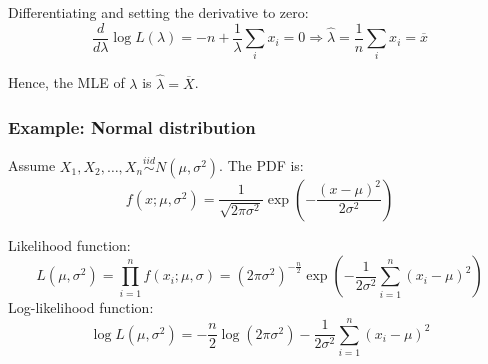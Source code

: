\documentclass[twoside]{book}
\begin{document}
Differentiating and setting the derivative to zero:
\[
\frac{d}{d\lambda}\log L(\lambda) = -n + \frac{1}{\lambda}\sum_i x_i = 0 \Rightarrow \hat{\lambda}  = \frac{1}{n} \sum_i x_i = \overline{x}
\]

Hence, the MLE of $\lambda$ is $\hat{\lambda} = \overline{X}$.

\subsubsection*{Example: Normal distribution}

Assume \( X_1, X_2, \dots, X_n \overset{iid}{\sim} N(\mu, \sigma^2) \). The PDF is:
\[
f(x; \mu, \sigma^2) = \frac{1}{\sqrt{2\pi\sigma^2}} \exp\left( -\frac{(x - \mu)^2}{2\sigma^2} \right)
\]

Likelihood function:
\[
L(\mu, \sigma^2) = \prod_{i=1}^{n}f(x_i; \mu, \sigma) =  (2\pi\sigma^2)^{-\tfrac{n}{2}} \exp \left( - \frac{1}{2\sigma^2} \sum_{i=1}^n (x_i - \mu)^2\right)
\]
Log-likelihood function:
\[
\log L(\mu,\sigma^2)= -\frac{n}{2} \log(2\pi\sigma^2) - \frac{1}{2\sigma^2} \sum_{i=1}^n (x_i - \mu)^2
\]
\end{document}
